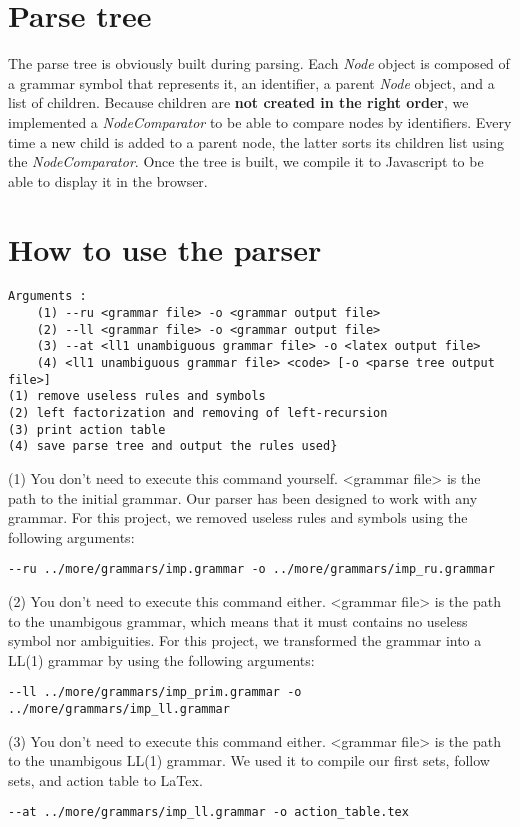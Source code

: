\section{Parse tree}

The parse tree is obviously built during parsing. Each \textit{Node} object is composed of a grammar symbol that represents it,
an identifier, a parent \textit{Node} object, and a list of children. Because children are \textbf{not created in the right order},
we implemented a \textit{NodeComparator} to be able to compare nodes by identifiers. Every time a new child is added to a parent node,
the latter sorts its children list using the \textit{NodeComparator}. Once the tree is built, we compile it to Javascript to be able
to display it in the browser.

\section{How to use the parser}

\begin{lstlisting}
Arguments :
	(1) --ru <grammar file> -o <grammar output file>
	(2) --ll <grammar file> -o <grammar output file>
	(3) --at <ll1 unambiguous grammar file> -o <latex output file>
	(4) <ll1 unambiguous grammar file> <code> [-o <parse tree output file>]
(1) remove useless rules and symbols
(2) left factorization and removing of left-recursion
(3) print action table
(4) save parse tree and output the rules used}
\end{lstlisting}

(1) You don't need to execute this command yourself. <grammar file> is the path to the initial grammar.
Our parser has been designed to work with any grammar. For this project, we removed useless rules and symbols
using the following arguments:
\begin{lstlisting}
--ru ../more/grammars/imp.grammar -o ../more/grammars/imp_ru.grammar
\end{lstlisting}

(2) You don't need to execute this command either. <grammar file> is the path to the unambigous grammar, which
means that it must contains no useless symbol nor ambiguities.
For this project, we transformed the grammar into a LL(1) grammar by using the following arguments:
\begin{lstlisting}
--ll ../more/grammars/imp_prim.grammar -o ../more/grammars/imp_ll.grammar
\end{lstlisting}

(3) You don't need to execute this command either. <grammar file> is the path to the unambigous LL(1) grammar.
We used it to compile our first sets, follow sets, and action table to LaTex.
\begin{lstlisting}
--at ../more/grammars/imp_ll.grammar -o action_table.tex
\end{lstlisting}

